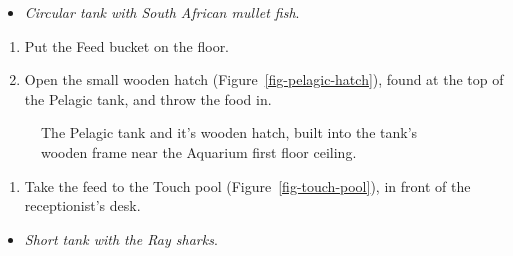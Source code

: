 \documentclass[
  12pt,
]{report}
\providecommand{\tightlist}{%
  \setlength{\itemsep}{0pt}\setlength{\parskip}{0pt}}\usepackage{longtable,booktabs,array}
\begin{document}
\begin{itemize}
\tightlist
\item
  \emph{Circular tank with South African mullet fish}.
\end{itemize}

\begin{enumerate}
\def\labelenumi{\arabic{enumi}.}
\setcounter{enumi}{13}
\tightlist
\item
  Put the Feed bucket on the floor.
\item
  Open the small wooden hatch (Figure~\ref{fig-pelagic-hatch}), found at
  the top of the Pelagic tank, and throw the food in.
\end{enumerate}

\begin{figure}[H]

\begin{minipage}[t]{0.50\linewidth}

{\centering 


}

\end{minipage}%
%
\begin{minipage}[t]{0.50\linewidth}

{\centering 


}

\end{minipage}%

\caption{\label{fig-pelagic}The Pelagic tank and it's wooden hatch,
built into the tank's wooden frame near the Aquarium first floor
ceiling.}

\end{figure}

\begin{enumerate}
\def\labelenumi{\arabic{enumi}.}
\setcounter{enumi}{15}
\tightlist
\item
  Take the feed to the Touch pool (Figure~\ref{fig-touch-pool}), in
  front of the receptionist's desk.
\end{enumerate}

\begin{itemize}
\tightlist
\item
  \emph{Short tank with the Ray sharks}.
\end{itemize}
\end{document}
